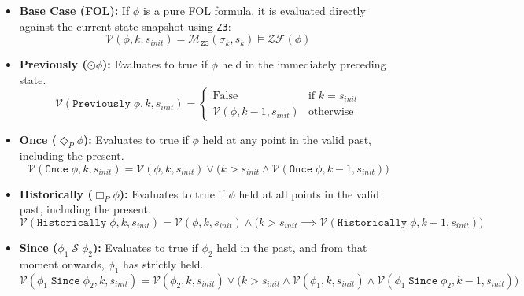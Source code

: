 \documentclass{article}
\begin{document}
\begin{itemize}
    \item \textbf{Base Case (FOL):} If $\phi$ is a pure FOL formula, it is evaluated directly against the current state snapshot using \texttt{Z3}:
    \[
    \mathcal{V}(\phi, k, s_{init}) = \mathcal{M}_{\mathtt{Z3}}(\sigma_k, s_k) \models \mathcal{ZF}(\phi)
    \]

    \item \textbf{Previously ($\odot \phi$):} Evaluates to true if $\phi$ held in the immediately preceding state.
    \[
    \mathcal{V}(\mathtt{Previously}\;\phi, k, s_{init}) = 
    \begin{cases} 
      \text{False} & \text{if } k = s_{init} \\
      \mathcal{V}(\phi, k-1, s_{init}) & \text{otherwise}
    \end{cases}
    \]

    \item \textbf{Once ($\Diamond_P \phi$):} Evaluates to true if $\phi$ held at any point in the valid past, including the present.
    \[
    \mathcal{V}(\mathtt{Once}\;\phi, k, s_{init}) = 
    \mathcal{V}(\phi, k, s_{init}) \lor \Big( k > s_{init} \land \mathcal{V}(\mathtt{Once}\;\phi, k-1, s_{init}) \Big)
    \]

    \item \textbf{Historically ($\Box_P \phi$):} Evaluates to true if $\phi$ held at all points in the valid past, including the present.
    \[
    \mathcal{V}(\mathtt{Historically}\;\phi, k, s_{init}) = 
    \mathcal{V}(\phi, k, s_{init}) \land \Big( k > s_{init} \implies \mathcal{V}(\mathtt{Historically}\;\phi, k-1, s_{init}) \Big)
    \]

    \item \textbf{Since ($\phi_1 \;\mathcal{S}\; \phi_2$):} Evaluates to true if $\phi_2$ held in the past, and from that moment onwards, $\phi_1$ has strictly held.
    \[
    \mathcal{V}(\phi_1 \;\mathtt{Since}\; \phi_2, k, s_{init}) = 
    \mathcal{V}(\phi_2, k, s_{init}) \lor \Big( k > s_{init} \land \mathcal{V}(\phi_1, k, s_{init}) \land \mathcal{V}(\phi_1 \;\mathtt{Since}\; \phi_2, k-1, s_{init}) \Big)
    \]
\end{itemize}
\end{document}
